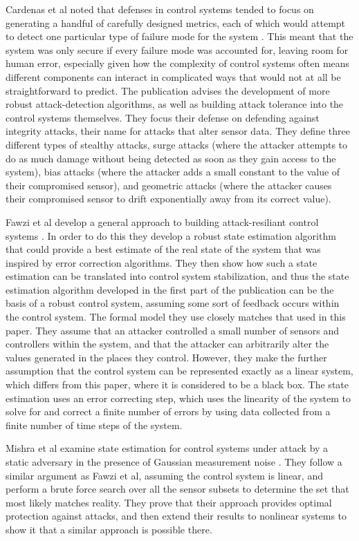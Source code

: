 \documentclass[10pt,twocolumn]{IEEEtran}
\begin{document}
Cardenas et al noted that defenses in control systems tended to focus on generating a handful of carefully designed metrics, each of which would attempt to detect one particular type of failure mode for the system \cite{attacks}.
This meant that the system was only secure if every failure mode was accounted for, leaving room for human error, especially given how the complexity of control systems often means different components can interact in complicated ways that would not at all be straightforward to predict.
The publication advises the development of more robust attack-detection algorithms, as well as building attack tolerance into the control systems themselves.
They focus their defense on defending against integrity attacks, their name for attacks that alter sensor data.
They define three different types of stealthy attacks, surge attacks (where the attacker attempts to do as much damage without being detected as soon as they gain access to the system), bias attacks (where the attacker adds a small constant to the value of their compromised sensor), and geometric attacks (where the attacker causes their compromised sensor to drift exponentially away from its correct value).

Fawzi et al develop a general approach to building attack-resiliant control systems \cite{secureestimation}.
In order to do this they develop a robust state estimation algorithm that could provide a best estimate of the real state of the system that was inspired by error correction algorithms.
They then show how such a state estimation can be translated into control system stabilization, and thus the state estimation algorithm developed in the first part of the publication can be the basis of a robust control system, assuming some sort of feedback occurs within the control system.
The formal model they use closely matches that used in this paper.
They assume that an attacker controlled a small number of sensors and controllers within the system, and that the attacker can arbitrarily alter the values generated in the places they control.
However, they make the further assumption that the control system can be represented exactly as a linear system, which differs from this paper, where it is considered to be a black box.
The state estimation uses an error correcting step, which uses the linearity of the system to solve for and correct a finite number of errors by using data collected from a finite number of time steps of the system.

Mishra et al examine state estimation for control systems under attack by a static adversary in the presence of Gaussian measurement noise \cite{noise}.
They follow a similar argument as Fawzi et al, assuming the control system is linear, and perform a brute force search over all the sensor subsets to determine the set that most likely matches reality.
They prove that their approach provides optimal protection against attacks, and then extend their results to nonlinear systems to show it that a similar approach is possible there.
\end{document}
